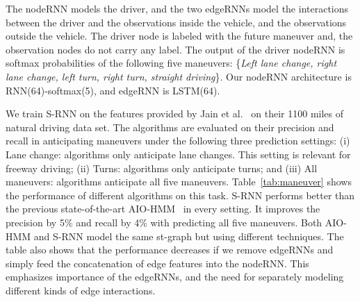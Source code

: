 \documentclass[10pt,twocolumn,letterpaper]{article}
\begin{document}
The nodeRNN models the driver, and the two edgeRNNs model the interactions between the driver and the observations inside the vehicle, and the observations outside the vehicle. The driver node is labeled with the future maneuver and, the observation nodes do not carry any label. The output of the driver nodeRNN is softmax probabilities of the following five maneuvers: \{\textit{Left lane change, right lane change, left turn, right turn, straight driving}\}.  Our nodeRNN architecture is RNN(64)-softmax(5), and edgeRNN is LSTM(64).


We train S-RNN on the features provided by Jain et al.~\cite{Jain15} on their 1100 miles of natural driving data set. The algorithms are evaluated on their precision and recall in anticipating maneuvers  under the following three prediction
settings: (i) Lane change: algorithms only anticipate lane changes. This setting is relevant for freeway driving; (ii) Turns: algorithms only anticipate turns; and (iii) All maneuvers: algorithms anticipate all five maneuvers. Table~\ref{tab:maneuver} shows the performance of different algorithms on this task.  S-RNN performs better than the previous state-of-the-art AIO-HMM~\cite{Jain15} in every setting.  It improves the precision  by 5\% and recall by 4\% with predicting all five maneuvers. Both AIO-HMM and S-RNN model the same st-graph but using different techniques. The table also shows that the performance decreases if we remove edgeRNNs and simply feed the concatenation of edge features into the nodeRNN. This emphasizes importance of the edgeRNNs,  and the need for separately modeling different kinds of edge interactions. 
\fi

\end{document}
